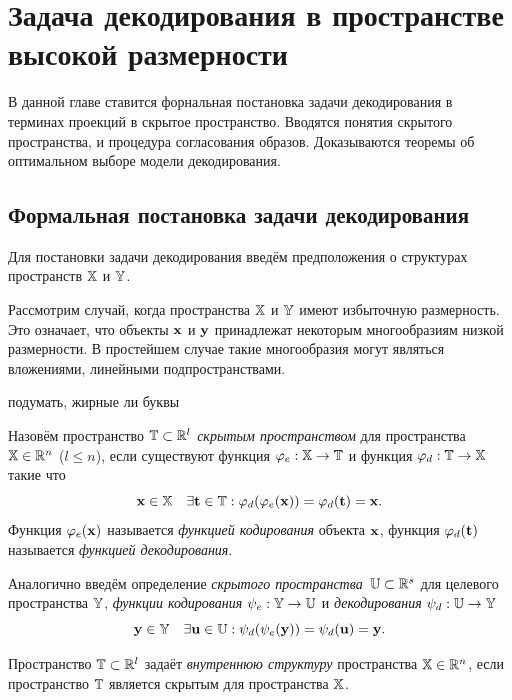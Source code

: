 \chapter{Задача декодирования в пространстве высокой размерности}
\label{chapter2}

В данной главе ставится форнальная постановка задачи декодирования в терминах проекций в скрытое пространство. 
Вводятся понятия скрытого пространства, и процедура согласования образов.
Доказываются теоремы об оптимальном выборе модели декодирования.

\section{Формальная постановка задачи декодирования}

Для постановки задачи декодирования введём предположения о структурах пространств $\mathbb{X}$ и $\mathbb{Y}$.
\begin{assumption}
	Рассмотрим случай, когда пространства $\mathbb{X}$ и $\mathbb{Y}$ имеют избыточную размерность. 
	Это означает, что объекты $\mathbf{x}$ и $\mathbf{y}$ принадлежат некоторым многообразиям низкой размерности. В простейшем случае такие многообразия могут являться вложениями, линейными подпространствами.
\end{assumption}

{\color{red} подумать, жирные ли буквы}

\begin{definition}
	Назовём пространство $\mathbb{T} \subset \mathbb{R}^l$ \textit{скрытым пространством} для пространства $\mathbb{X} \in \mathbb{R}^n$ ($l \leq n$), если существуют функция $\varphi_e: \mathbb{X} \to \mathbb{T}$ и функция $\varphi_d: \mathbb{T}  \to \mathbb{X}$ такие что
	\[
	\mathbf{x} \in \mathbb{X} \quad \exists \mathbf{t} \in \mathbb{T}: \varphi_d (\varphi_e(\mathbf{x})) = \varphi_d(\mathbf{t}) = \mathbf{x}.
	\]
	Функция $\varphi_e(\mathbf{x})$ называется \textit{функцией кодирования} объекта $\mathbf{x}$, функция $\varphi_d(\mathbf{t})$  называется \textit{функцией декодирования}. 
	
	Аналогично введём определение \textit{скрытого пространства}~$\mathbb{U} \subset \mathbb{R}^s$ для целевого пространства $\mathbb{Y}$, \textit{функции кодирования} $\psi_e: \mathbb{Y} \to \mathbb{U}$ и \textit{декодирования} $\psi_d: \mathbb{U}  \to \mathbb{Y}$
	\[
	 \mathbf{y} \in \mathbb{Y} \quad  \exists \mathbf{u} \in \mathbb{U}: \psi_d (\psi_e(\mathbf{y})) = \psi_d(\mathbf{u}) = \mathbf{y}.
	\]
\end{definition}

\begin{definition}
	Пространство $\mathbb{T} \subset \mathbb{R}^l$ задаёт \textit{внутреннюю структуру} пространства $\mathbb{X} \in \mathbb{R}^n$, если пространство $\mathbb{T}$ является скрытым для пространства $\mathbb{X}$.
\end{definition}

